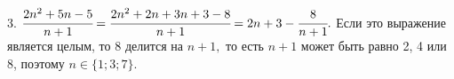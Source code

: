 3. $\cfrac{2n^2+5n-5}{n+1}=\cfrac{2n^2+2n+3n+3-8}{n+1}=2n+3-\cfrac{8}{n+1}.$ Если это выражение является целым, то 8 делится на $n+1,$ то есть $n+1$ может быть равно 2, 4 или 8, поэтому $n\in \{1;3;7\}.$\\
